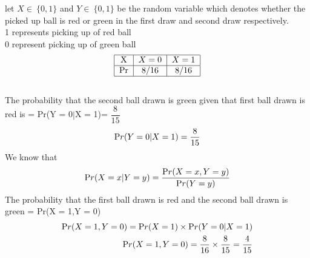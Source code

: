 
let $X \in\ \{0,1\}$ and  $Y \in\ \{0,1\}$ be the random variable  which denotes whether the picked up ball  is red or green in the first draw and second draw respectively.\\
 1 represents picking up of red ball\\
 0 represent picking up of  green  ball\\
 \begin{align}
  \begin{tabular}{| c| c| c| }
  \hline
 X & $X=0$ & $X=1$\\ 
 \hline
Pr &$8/16$ & $8/16$ \\  
 \hline
\end{tabular}
\end{align}\\
The probability that the second ball drawn is green given that first ball drawn is red is =  Pr(Y = 0$|$X = 1)= $\dfrac{8}{15}$
\begin{align}
 \mbox Pr(Y = 0|X = 1)= \dfrac{8}{15} 
\end{align}
 We know that\\
\begin{align}
 \mbox Pr(X=x | Y=y) = \frac { \mbox Pr(X=x,Y=y)}{\mbox Pr(Y=y)}
\end{align}
The probability that the first ball drawn is red and the second ball drawn is green = \mbox Pr(X = 1,Y = 0)\\
\begin{align}
\mbox Pr(X=1,Y=0) = \mbox Pr(X=1) \times \mbox Pr(Y=0|X=1 )\\
\mbox Pr(X=1,Y=0) =   \dfrac{8}{16} \times \dfrac{8}{15} = \dfrac{4}{15} 
\end{align}